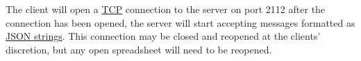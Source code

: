 The client will open a \href{https://en.wikipedia.org/wiki/Transmission_Control_Protocol}{TCP} 
connection to the server on port 2112 after the connection has been opened, 
the server will start accepting messages formatted as \href{https://en.wikipedia.org/wiki/JSON}{JSON strings}. 
This connection may be closed and reopened at the clients’ discretion, but any open spreadsheet will need to be reopened.
